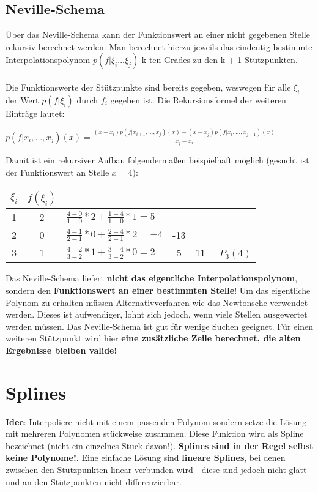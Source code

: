 \documentclass[10pt,a4paper]{article}
\begin{document}
	\subsection{Neville-Schema}
	Über das Neville-Schema kann der Funktionswert an einer nicht gegebenen Stelle rekursiv berechnet werden. Man berechnet hierzu jeweils das eindeutig bestimmte Interpolationspolynom $p(f|\xi_i ... \xi_j)$ k-ten Grades zu den k + 1 Stützpunkten.\\\\ Die Funktionswerte der Stützpunkte sind bereits gegeben, weswegen für alle $\xi_i$ der Wert $p(f|\xi_i)$ durch $f_i$ gegeben ist. Die Rekursionsformel der weiteren Einträge lautet:
	\begin{center}
		$p(f|x_i,...,x_j)(x) = \frac{(x - x_i) p(f|x_{i + 1},...,x_j)(x) - (x - x_j)p(f|x_i,...,x_{j-1})(x)}{x_j - x_i}$
	\end{center}
	Damit ist ein rekursiver Aufbau folgendermaßen beispielhaft möglich (gesucht ist der Funktionswert an Stelle $x = 4$):\\
	\begin{center}
		\begin{tabular}{c | c l c c}
			$\xi_i$ & $f(\xi_i)$ & & &\\
			\hline
			1 & 2 & $\frac{4 - 0}{1 - 0} * 2 + \frac{1 - 4}{1 - 0} * 1 = 5$ & &\\
			2 & 0 & $\frac{4 - 1}{2 - 1} * 0 + \frac{2 - 4}{2 - 1} * 2 = -4$ & -13 &\\
			3 & 1 & $\frac{4 - 2}{3 - 2} * 1 + \frac{3 - 4}{3 - 2} * 0 = 2$ & 5 & 11 = $P_3(4)$
		\end{tabular}
	\end{center}
	Das Neville-Schema liefert \textbf{nicht das eigentliche Interpolationspolynom}, sondern den \textbf{Funktionswert an einer bestimmten Stelle}! Um das eigentliche Polynom zu erhalten müssen Alternativverfahren wie das Newtonsche verwendet werden. Dieses ist aufwendiger, lohnt sich jedoch, wenn viele Stellen ausgewertet werden müssen. Das Neville-Schema ist gut für wenige Suchen geeignet. Für einen weiteren Stützpunkt wird hier \textbf{eine zusätzliche Zeile berechnet, die alten Ergebnisse bleiben valide!}
	\newpage
	\section{Splines}
	\textbf{Idee}: Interpoliere nicht mit einem passenden Polynom sondern setze die Lösung mit mehreren Polynomen stückweise zusammen. Diese Funktion wird als Spline bezeichnet (nicht ein einzelnes Stück davon!). \textbf{Splines sind in der Regel selbst keine Polynome!}. Eine einfache Lösung sind \textbf{lineare Splines}, bei denen zwischen den Stützpunkten linear verbunden wird - diese sind jedoch nicht glatt und an den Stützpunkten nicht differenzierbar.
	
\end{document}
